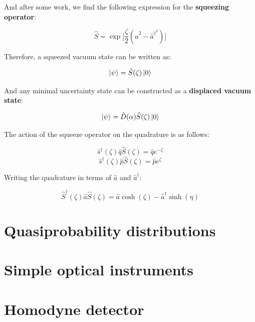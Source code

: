 \documentclass[12pt,a4paper]{report}
\begin{document}
And after some work, we find the following expression for the \textbf{squeezing operator}:

\begin{equation}
\hat S= \exp\Big[ \frac{\zeta}{2}(\hat a^2 - \hat a^{\dag}^2) \Big]
\end{equation}

Therefore, a squeezed vacuum state can be written as:

\begin{equation}
    \ket{\psi}=\hat S(\zeta)\ket{0}
\end{equation}

And any minimal uncertainty state can be constructed as a \textbf{displaced vacuum state}:

\begin{equation}
    \ket{\psi}=\hat  D(\alpha) \hat S(\zeta)\ket{0}
\end{equation}

The action of the squeeze operator on the quadrature is as follows:

\begin{equation}
    \hat s^{\dag}(\zeta)\hat q\hat S(\zeta)=\hat q e^{-\zeta}
\end{equation}
\begin{equation}
    \hat s^{\dag}(\zeta)\hat p\hat S(\zeta)=\hat p e^{\zeta}
\end{equation}

Writing the quadrature in terms of $\hat a$ and $\hat a^{\dag}$:

\begin{equation}
    \hat S^{\dag}(\zeta)\hat a \hat S(\zeta)=\hat a \cosh(\zeta)-\hat a^{\dag}\sinh(\eta)
\end{equation}


\section{Quasiprobability distributions}

\section{Simple optical instruments}

\section{Homodyne detector}
\end{document}
